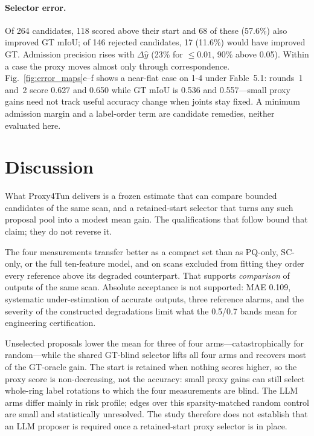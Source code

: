 \documentclass[a4paper,fleqn]{cas-dc}
\begin{document}
\paragraph{Selector error.}
Of 264 candidates, 118 scored above their start and 68 of these (57.6\%) also improved GT mIoU; of 146 rejected candidates, 17 (11.6\%) would have improved GT. Admission precision rises with $\Delta\hat y$ (23\% for $\le0.01$, 90\% above 0.05). Within a case the proxy moves almost only through correspondence. Fig.~\ref{fig:error_maps}e--f shows a near-flat case on 1-4 under Fable~5.1: rounds~1 and~2 score 0.627 and 0.650 while GT mIoU is 0.536 and 0.557---small proxy gains need not track useful accuracy change when joints stay fixed. A minimum admission margin and a label-order term are candidate remedies, neither evaluated here.

\section{Discussion}\label{sec:discussion}

What Proxy4Tun delivers is a frozen estimate that can compare bounded candidates of the same scan, and a retained-start selector that turns any such proposal pool into a modest mean gain. The qualifications that follow bound that claim; they do not reverse it.

The four measurements transfer better as a compact set than as PQ-only, SC-only, or the full ten-feature model, and on scans excluded from fitting they order every reference above its degraded counterpart. That supports \emph{comparison} of outputs of the same scan. Absolute acceptance is not supported: MAE 0.109, systematic under-estimation of accurate outputs, three reference alarms, and the severity of the constructed degradations limit what the 0.5/0.7 bands mean for engineering certification.

Unselected proposals lower the mean for three of four arms---catastrophically for random---while the shared GT-blind selector lifts all four arms and recovers most of the GT-oracle gain. The start is retained when nothing scores higher, so the proxy score is non-decreasing, not the accuracy: small proxy gains can still select whole-ring label rotations to which the four measurements are blind. The LLM arms differ mainly in risk profile; edges over this sparsity-matched random control are small and statistically unresolved. The study therefore does not establish that an LLM proposer is required once a retained-start proxy selector is in place.
\end{document}
